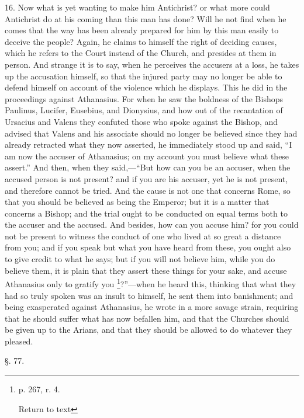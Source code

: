 16. Now what is yet wanting to make him
Antichrist? or what more could Antichrist do at his coming than this
man has done? Will he not find when he comes that the way has been
already prepared for him by this man easily to deceive the people?
Again, he claims to himself the right of deciding causes, which he
refers to the Court instead of the Church, and presides at them in
person. And strange it is to say, when he perceives the accusers at a
loss, he takes up the accusation himself, so that the injured party
may no longer be able to defend himself on account of the violence
which he displays. This he did in the proceedings against Athanasius.
For when he saw the boldness of the Bishops Paulinus, Lucifer,
Eusebius, and Dionysius, and how out of the recantation of
Ursacius and Valens they confuted those who spoke against the Bishop,
and advised that Valens and his associate should no longer be believed
since they had already retracted what they now asserted, he
immediately stood up and said, ``I am now the accuser of Athanasius; on
my account you must believe what these assert.'' And then, when they
said,—``But how can you be an accuser, when the accused person is not
present? and if you are his accuser, yet he is not present, and
therefore cannot be tried. And the cause is not one that concerns
Rome, so that you should be believed as being the Emperor; but it is a
matter that concerns a Bishop; and the trial ought to be conducted on
equal terms both to the accuser and the accused. And besides, how can
you accuse him? for you could not be present to witness the conduct of
one who lived at so great a distance from you; and if you speak but
what you have heard from these, you ought also to give credit to what
he says; but if you will not believe him, while you do believe them,
it is plain that they assert these things for your sake, and accuse
Athanasius only to gratify you \footnote{p. 267, r. 4.

Return to text}?''—when he heard this,
thinking that what they had so truly spoken was an insult to himself,
he sent them into banishment; and being exasperated against
Athanasius, he wrote in a more savage strain, requiring that he should
suffer what has now befallen him, and that the Churches should be
given up to the Arians, and that they should be allowed to do whatever
they pleased.

§. 77.

